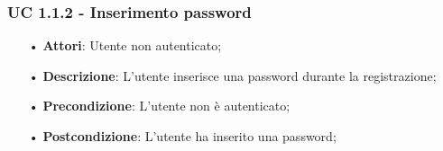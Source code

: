 \subsubsection{UC 1.1.2 - Inserimento password}
\begin{itemize}
\item[•]\textbf{Attori}: Utente non autenticato;
\item[•]\textbf{Descrizione}: L’utente inserisce una password durante la registrazione;
\item[•]\textbf{Precondizione}: L'utente non è autenticato;
\item[•]\textbf{Postcondizione}: L'utente ha inserito una password;
\end{itemize}



